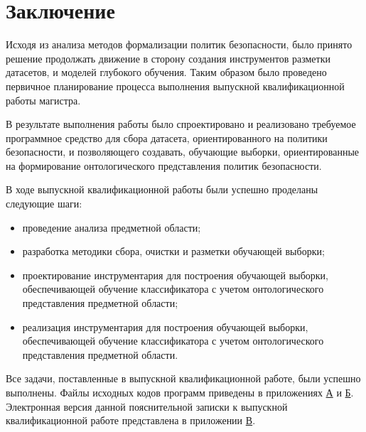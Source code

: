 \documentclass[../main]{subfiles}
\begin{document}
\newpage
{}
{}
\section*{Заключение}

Исходя из анализа методов формализации политик безопасности, было принято решение продолжать движение в сторону создания инструментов разметки датасетов, и моделей глубокого обучения. Таким образом было проведено первичное планирование процесса выполнения выпускной квалификационной работы магистра.

В результате выполнения работы было спроектировано и реализовано требуемое программное средство для сбора датасета, ориентированного на политики безопасности, и позволяющего создавать, обучающие выборки, ориентированные на формирование онтологического представления политик безопасности.

В ходе выпускной квалификационной работы были успешно проделаны следующие шаги:
\begin{itemize}
    \item проведение анализа предметной области;
    \item разработка методики сбора, очистки и разметки обучающей выборки;
    \item проектирование инструментария для построения обучающей выборки, обеспечивающей обучение классификатора с учетом онтологического представления предметной области;
    \item реализация инструментария для построения обучающей выборки, обеспечивающей обучение классификатора с учетом онтологического представления предметной области.
\end{itemize}

Все задачи, поставленные в выпускной квалификационной работе, были успешно выполнены. Файлы исходных кодов программ приведены в приложениях \hyperref[sec:appendix1]{А} и \hyperref[sec:appendix2]{Б}. Электронная версия данной  пояснительной записки к выпускной квалификационной работе представлена в приложении \hyperref[sec:appendix3]{В}.
\end{document}
